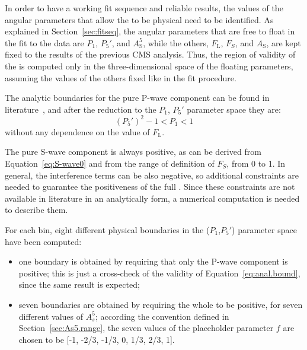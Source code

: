 In order to have a working fit sequence and reliable results, the values of the angular parameters that allow the \pdf to be physical need to be identified.
As explained in Section~\ref{sec:fitseq}, the angular parameters that are free to float in the fit to the data are $P_1$, $P_5'$, and $A^5_\mathrm{S}$, while the others, $F_\mathrm{L}$, $F_S$, and $A_\mathrm{S}$, are kept fixed to the results of the previous CMS analysis.
Thus, the region of validity of the \pdf is computed only in the three-dimensional space of the floating parameters, assuming the values of the others fixed like in the fit procedure.

The analytic boundaries for the pure P-wave component can be found in literature~\cite{Matias:2014jua}, and after the reduction to the $P_1$, $P_5'$ parameter space they are:
\begin{equation} \label{eq:anal.bound}
  (P_5')^2 - 1 < P_1 < 1
\end{equation}
without any dependence on the value of $F_\mathrm{L}$.

The pure S-wave component is always positive, as can be derived from Equation~\ref{eq:S-wave0} and from the range of definition of $F_S$, from 0 to 1.
In general, the interference terms can be also negative, so additional constraints are needed to guarantee the positiveness of the full \pdf.
Since these constraints are not available in literature in an analytically form, a numerical computation is needed to describe them.


For each bin, eight different physical boundaries in the ($P_1$,$P_5'$) parameter space have been computed:
\begin{itemize}
\item one boundary is obtained by requiring that only the P-wave component is positive; this is just a cross-check of the validity of Equation~\ref{eq:anal.bound}, since the same result is expected;
\item seven boundaries are obtained by requiring the whole \pdf to be positive, for seven different values of $A_s^5$; according the convention defined in Section~\ref{sec:As5.range}, the seven values of the placeholder parameter $f$ are chosen to be [-1, -2/3, -1/3, 0, 1/3, 2/3, 1].
\end{itemize}

